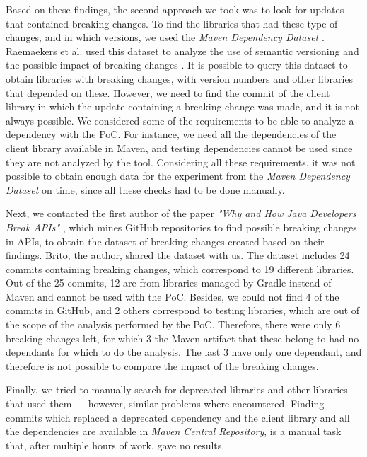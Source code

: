 Based on these findings, the second approach we took was to look for updates that contained breaking changes. To find the libraries that had these type of changes, and in which versions, we used the \textit{Maven Dependency Dataset} \cite{Raemaekers2013}. Raemaekers et al. used this dataset to analyze the use of semantic versioning and the possible impact of breaking changes \cite{Raemaekers2017}. It is possible to query this dataset to obtain libraries with breaking changes, with version numbers and other libraries that depended on these. However, we need to find the commit of the client library in which the update containing a breaking change was made, and it is not always possible. We considered some of the requirements to be able to analyze a dependency with the PoC. For instance, we need all the dependencies of the client library available in Maven, and testing dependencies cannot be used since they are not analyzed by the tool. Considering all these requirements, it was not possible to obtain enough data for the experiment from the \textit{Maven Dependency Dataset} on time, since all these checks had to be done manually.

Next, we contacted the first author of the paper \textit{"Why and How Java Developers Break APIs"} \cite{Brito2018}, which mines GitHub repositories to find possible breaking changes in APIs, to obtain the dataset of breaking changes created based on their findings. Brito, the author, shared the dataset with us. The dataset includes 24 commits containing breaking changes, which correspond to 19 different libraries. Out of the 25 commits, 12 are from libraries managed by Gradle instead of Maven and cannot be used with the PoC. Besides, we could not find 4 of the commits in GitHub, and 2 others correspond to testing libraries, which are out of the scope of the analysis performed by the PoC. Therefore, there were only 6 breaking changes left, for which 3 the Maven artifact that these belong to had no dependants for which to do the analysis. The last 3 have only one dependant, and therefore is not possible to compare the impact of the breaking changes.

Finally, we tried to manually search for deprecated libraries and other libraries that used them — however, similar problems where encountered. Finding commits which replaced a deprecated dependency and the client library and all the dependencies are available in \textit{Maven Central Repository}, is a manual task that, after multiple hours of work, gave no results.


